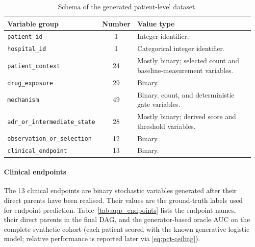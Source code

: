 \begin{table}[htbp]
    \centering
    \caption{Schema of the generated patient-level dataset.}
    \label{tab:patient_dataset_schema}
    \begin{tabularx}{\textwidth}{@{}X c X@{}}
        \toprule
        \textbf{Variable group} &
        \textbf{Number} &
        \textbf{Value type} \\
        \midrule

        \texttt{patient\_id} &
        1 &
        Integer identifier. \\

        \addlinespace
        \texttt{hospital\_id} &
        1 &
        Categorical integer identifier. \\

        \addlinespace
        \texttt{patient\_context} &
        24 &
        Mostly binary; selected count and baseline-measurement variables. \\

        \addlinespace
        \texttt{drug\_exposure} &
        29 &
        Binary. \\

        \addlinespace
        \texttt{mechanism} &
        49 &
        Binary, count, and deterministic gate variables. \\

        \addlinespace
        \texttt{adr\_or\_intermediate\_state} &
        28 &
        Mostly binary; derived score and threshold variables. \\

        \addlinespace
        \texttt{observation\_or\_selection} &
        12 &
        Binary. \\

        \addlinespace
        \texttt{clinical\_endpoint} &
        13 &
        Binary. \\

        \bottomrule
    \end{tabularx}
\end{table}

\paragraph{Clinical endpoints}

The 13 clinical endpoints are binary stochastic variables generated after
their direct parents have been realised. Their values are the ground-truth
labels used for endpoint prediction. Table~\ref{tab:app_endpoints} lists the
endpoint names, their direct parents in the final DAG, and the
generator-based oracle AUC on the complete synthetic cohort (each patient
scored with the known generative logistic model; relative performance is
reported later via \cref{eq:pct-ceiling}).

